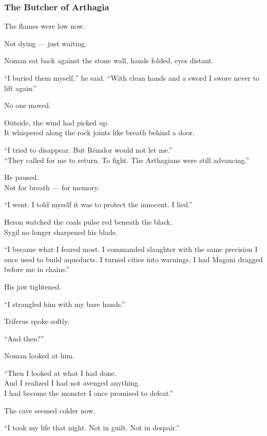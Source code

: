 \documentclass[12pt]{article}
\begin{document}
\dotfill

\subsubsection*{The Butcher of Arthagia}

The flames were low now.

Not dying — just waiting.

Noman sat back against the stone wall, hands folded, eyes distant.

“I buried them myself,” he said. “With clean hands and a sword I swore never to lift again.”

No one moved.

Outside, the wind had picked up.\\
It whispered along the rock joints like breath behind a door.

“I tried to disappear. But Rēmdor would not let me.”\\
“They called for me to return. To fight. The Arthagians were still advancing.”

He paused.\\
Not for breath — for memory.

“I went. I told myself it was to protect the innocent. I lied.”

\vspace{1em}

Heron watched the coals pulse red beneath the black.\\
Sygil no longer sharpened his blade.

“I became what I feared most. I commanded slaughter with the same precision I once used to build aqueducts. I turned cities into warnings. I had Magoni dragged before me in chains.”

His jaw tightened.

“I strangled him with my bare hands.”

\vspace{1em}

Triferus spoke softly.

“And then?”

Noman looked at him.

“Then I looked at what I had done.\\
And I realized I had not avenged anything.\\
I had become the monster I once promised to defeat.”

The cave seemed colder now.

“I took my life that night. Not in guilt. Not in despair.”
\end{document}
